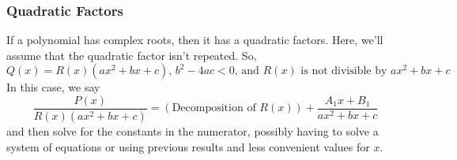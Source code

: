 \subsubsection{Quadratic Factors}
\noindent
If a polynomial has complex roots, then it has a quadratic factors.
Here, we'll assume that the quadratic factor isn't repeated. 
So,
\begin{equation*}
	Q(x) = R(x)(ax^2+bx+c)\text{, }b^2-4ac < 0\text{, and }R(x)\text{ is not divisible by }ax^2+bx+c
\end{equation*}
In this case, we say
\begin{equation*}
	\frac{P(x)}{R(x)(ax^2+bx+c)} = \left(\text{Decomposition of }R(x)\right)+\frac{A_1x+B_1}{ax^2+bx+c}
\end{equation*}
and then solve for the constants in the numerator, possibly having to solve a system of equations or using previous results and less convenient values for $x$.

